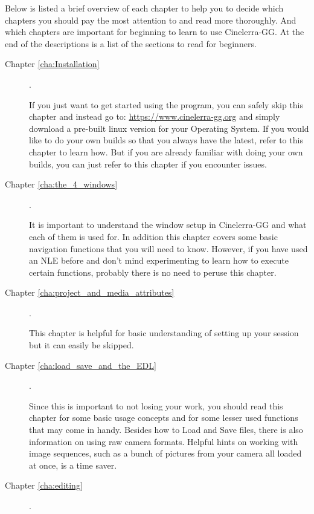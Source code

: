 Below is listed a brief overview of each chapter to help you to decide which chapters you should pay the most attention to and read more thoroughly. 
And which chapters are important for beginning to learn to use Cinelerra-GG. At the end of the descriptions is a list of the sections to read for beginners.

\begin{description}
    \item[Chapter \ref{cha:Installation} ] .

        If you just want to get started using the program, you can safely skip this chapter and instead go to:
        {\small \url{https://www.cinelerra-gg.org}}
        and simply download a pre-built linux version for your Operating System. If you would like to do your own builds so that you always have the latest, refer to this chapter to learn how. 
        But if you are already familiar with doing your own builds, you can just refer to this chapter if you encounter issues.
    \item[Chapter \ref{cha:the_4_windows} ] .

        It is important to understand the window setup in Cinelerra-GG and what each of them is used for. 
        In addition this chapter covers some basic navigation functions that you will need to know. 
        However, if you have used an NLE before and don’t mind experimenting to learn how to execute certain functions, probably there is no need to peruse this chapter.
    \item[Chapter \ref{cha:project_and_media_attributes}] .

        This chapter is helpful for basic understanding of setting up your session but it can easily be skipped.

    \item[Chapter \ref{cha:load_save_and_the_EDL}] .

        Since this is important to not losing your work, you should read this chapter for some basic usage concepts and for some lesser used functions that may come in handy. 
        Besides how to Load and Save files, there is also information on using raw camera formats. 
        Helpful hints on working with image sequences, such as a bunch of pictures from your camera all loaded at once, is a time saver.

    \item[Chapter \ref{cha:editing}] .


\end{description}
